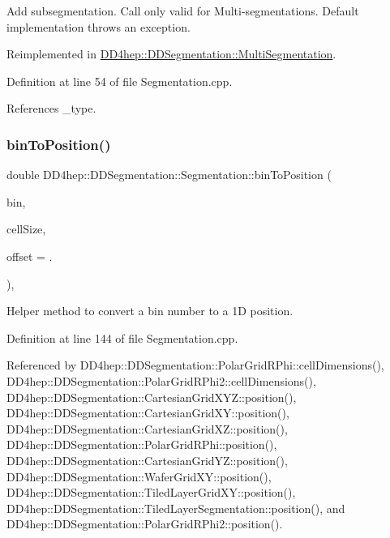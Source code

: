 Add subsegmentation. Call only valid for Multi-\/segmentations. Default implementation throws an exception. 



Reimplemented in \hyperlink{class_d_d4hep_1_1_d_d_segmentation_1_1_multi_segmentation_aa92e91f45ba11b074fd6cafb87e15325}{D\+D4hep\+::\+D\+D\+Segmentation\+::\+Multi\+Segmentation}.



Definition at line 54 of file Segmentation.\+cpp.



References \+\_\+type.

\hypertarget{class_d_d4hep_1_1_d_d_segmentation_1_1_segmentation_a550acc9cdf597965091b4d76ce1578cb}{}\label{class_d_d4hep_1_1_d_d_segmentation_1_1_segmentation_a550acc9cdf597965091b4d76ce1578cb} 
\subsubsection{\texorpdfstring{bin\+To\+Position()}{binToPosition()}\hspace{0.1cm}{\footnotesize\ttfamily [1/2]}}
{\footnotesize\ttfamily double D\+D4hep\+::\+D\+D\+Segmentation\+::\+Segmentation\+::bin\+To\+Position (\begin{DoxyParamCaption}\item[{\hyperlink{namespace_d_d4hep_1_1_d_d_segmentation_ac7af071d85cb48820914434a07e21ba1}{Cell\+ID}}]{bin,  }\item[{double}]{cell\+Size,  }\item[{double}]{offset = {.} }\end{DoxyParamCaption})\hspace{0.3cm}{\ttfamily [static]}, {\ttfamily [protected]}}



Helper method to convert a bin number to a 1D position. 



Definition at line 144 of file Segmentation.\+cpp.



Referenced by D\+D4hep\+::\+D\+D\+Segmentation\+::\+Polar\+Grid\+R\+Phi\+::cell\+Dimensions(), D\+D4hep\+::\+D\+D\+Segmentation\+::\+Polar\+Grid\+R\+Phi2\+::cell\+Dimensions(), D\+D4hep\+::\+D\+D\+Segmentation\+::\+Cartesian\+Grid\+X\+Y\+Z\+::position(), D\+D4hep\+::\+D\+D\+Segmentation\+::\+Cartesian\+Grid\+X\+Y\+::position(), D\+D4hep\+::\+D\+D\+Segmentation\+::\+Cartesian\+Grid\+X\+Z\+::position(), D\+D4hep\+::\+D\+D\+Segmentation\+::\+Polar\+Grid\+R\+Phi\+::position(), D\+D4hep\+::\+D\+D\+Segmentation\+::\+Cartesian\+Grid\+Y\+Z\+::position(), D\+D4hep\+::\+D\+D\+Segmentation\+::\+Wafer\+Grid\+X\+Y\+::position(), D\+D4hep\+::\+D\+D\+Segmentation\+::\+Tiled\+Layer\+Grid\+X\+Y\+::position(), D\+D4hep\+::\+D\+D\+Segmentation\+::\+Tiled\+Layer\+Segmentation\+::position(), and D\+D4hep\+::\+D\+D\+Segmentation\+::\+Polar\+Grid\+R\+Phi2\+::position().

